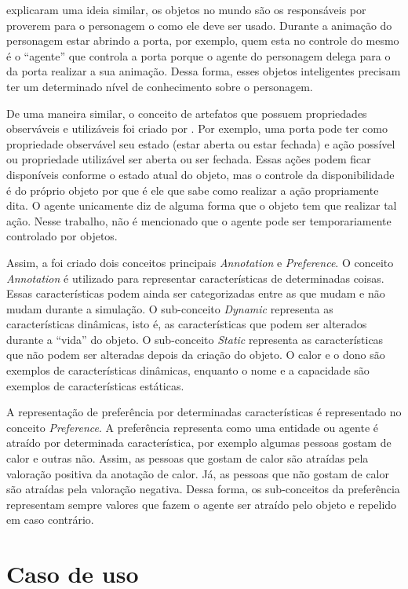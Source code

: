 \citet{kallmann1999modeling} explicaram uma ideia similar, os objetos no mundo
são os responsáveis por proverem para o personagem o como ele deve ser usado.
Durante a animação do personagem estar abrindo a porta, por exemplo, quem esta
no controle do mesmo é o ``agente'' que controla a porta porque o agente do
personagem delega para o da porta realizar a sua animação. Dessa forma,
esses objetos inteligentes precisam ter um determinado nível de conhecimento
sobre o personagem.

De uma maneira similar, o conceito de artefatos que possuem propriedades
observáveis e utilizáveis foi criado por \citet{ricci31cartago}. Por exemplo,
uma porta pode ter como propriedade observável seu estado (estar aberta ou
estar fechada) e ação possível ou propriedade utilizável ser aberta ou ser
fechada. Essas ações podem ficar disponíveis conforme o estado atual do
objeto, mas o controle da disponibilidade é do próprio objeto por que é ele
que sabe como realizar a ação propriamente dita. O agente unicamente diz de
alguma forma que o objeto tem que realizar tal ação. Nesse trabalho, não é
mencionado que o agente pode ser temporariamente controlado por objetos.

Assim, a foi criado dois conceitos principais \emph{Annotation} e
\emph{Preference}. O conceito \emph{Annotation} é utilizado para representar
características de determinadas coisas. Essas características podem ainda
ser categorizadas entre as que mudam e não mudam durante a simulação. O
sub-conceito \emph{Dynamic} representa as características dinâmicas, isto é,
as características que podem ser alterados durante a ``vida'' do objeto. O
sub-conceito \emph{Static} representa as características que não podem ser
alteradas depois da criação do objeto. O calor e o dono são exemplos de
características dinâmicas, enquanto o nome e a capacidade são exemplos de
características estáticas.

A representação de preferência por determinadas características é representado
no conceito \emph{Preference}. A preferência representa como uma entidade ou
agente é atraído por determinada característica, por exemplo algumas pessoas
gostam de calor e outras não. Assim, as pessoas que gostam de calor são
atraídas pela valoração positiva da anotação de calor. Já, as pessoas que não
gostam de calor são atraídas pela valoração negativa. Dessa forma, os
sub-conceitos da preferência representam sempre valores que fazem o agente ser
atraído pelo objeto e repelido em caso contrário.

\section{Caso de uso} \label{cap:tp:cdu}


